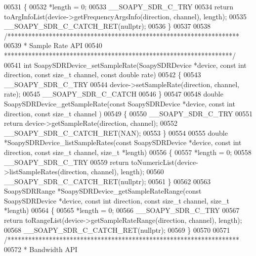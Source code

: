 \begin{DoxyCode}
00531 \{
00532     *length = 0;
00533     __SOAPY_SDR_C_TRY
00534     \textcolor{keywordflow}{return} toArgInfoList(device->getFrequencyArgsInfo(direction, channel), 
      length);
00535     __SOAPY_SDR_C_CATCH_RET(\textcolor{keyword}{nullptr});
00536 \}
00537 
00538 \textcolor{comment}{/*******************************************************************}
00539 \textcolor{comment}{ * Sample Rate API}
00540 \textcolor{comment}{ ******************************************************************/}
00541 \textcolor{keywordtype}{int} SoapySDRDevice_setSampleRate(SoapySDRDevice *device, \textcolor{keyword}{const} \textcolor{keywordtype}{int} direction, \textcolor{keyword}{const} \textcolor{keywordtype}{size\_t} channel, \textcolor{keyword}{const} \textcolor{keywordtype}{
      double} rate)
00542 \{
00543     __SOAPY_SDR_C_TRY
00544     device->setSampleRate(direction, channel, rate);
00545     __SOAPY_SDR_C_CATCH
00546 \}
00547 
00548 \textcolor{keywordtype}{double} SoapySDRDevice_getSampleRate(\textcolor{keyword}{const} SoapySDRDevice *device, \textcolor{keyword}{const} \textcolor{keywordtype}{int} direction, \textcolor{keyword}{const} \textcolor{keywordtype}{size\_t} channel
      )
00549 \{
00550     __SOAPY_SDR_C_TRY
00551     \textcolor{keywordflow}{return} device->getSampleRate(direction, channel);
00552     __SOAPY_SDR_C_CATCH_RET(NAN);
00553 \}
00554 
00555 \textcolor{keywordtype}{double} *SoapySDRDevice_listSampleRates(\textcolor{keyword}{const} SoapySDRDevice *device, \textcolor{keyword}{const} \textcolor{keywordtype}{int} direction, \textcolor{keyword}{const} \textcolor{keywordtype}{size\_t} 
      channel, \textcolor{keywordtype}{size\_t} *length)
00556 \{
00557     *length = 0;
00558     __SOAPY_SDR_C_TRY
00559     \textcolor{keywordflow}{return} toNumericList(device->listSampleRates(direction, channel), length);
00560     __SOAPY_SDR_C_CATCH_RET(\textcolor{keyword}{nullptr});
00561 \}
00562 
00563 SoapySDRRange *SoapySDRDevice_getSampleRateRange(\textcolor{keyword}{const} SoapySDRDevice *device, \textcolor{keyword}{const} \textcolor{keywordtype}{int} direction, \textcolor{keyword}{const} \textcolor{keywordtype}{
      size\_t} channel, \textcolor{keywordtype}{size\_t} *length)
00564 \{
00565     *length = 0;
00566     __SOAPY_SDR_C_TRY
00567     \textcolor{keywordflow}{return} toRangeList(device->getSampleRateRange(direction, channel), length);
00568     __SOAPY_SDR_C_CATCH_RET(\textcolor{keyword}{nullptr});
00569 \}
00570 
00571 \textcolor{comment}{/*******************************************************************}
00572 \textcolor{comment}{ * Bandwidth API}

\end{DoxyCode}
